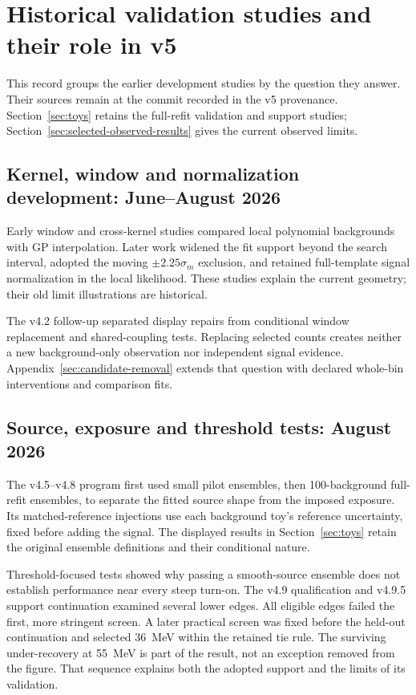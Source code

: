 \section{Historical validation studies and their role in v5}
\label{sec:v5-historical-validation}

This record groups the earlier development studies by the question they answer.
Their sources remain at the commit recorded in the v5 provenance.
Section~\ref{sec:toys} retains the full-refit validation and support studies;
Section~\ref{sec:selected-observed-results} gives the current observed limits.

\subsection{Kernel, window and normalization development: June--August 2026}
Early window and cross-kernel studies compared local polynomial backgrounds
with GP interpolation. Later work widened the fit support beyond the search
interval, adopted the moving $\pm2.25\sigma_m$ exclusion, and retained
full-template signal normalization in the local likelihood. These studies
explain the current geometry; their old limit illustrations are historical.

The v4.2 follow-up separated display repairs from conditional window
replacement and shared-coupling tests. Replacing selected counts creates
neither a new background-only observation nor independent signal evidence.
Appendix~\ref{sec:candidate-removal} extends that question with declared
whole-bin interventions and comparison fits.

\subsection{Source, exposure and threshold tests: August 2026}
The v4.5--v4.8 program first used small pilot ensembles, then 100-background
full-refit ensembles, to separate the fitted source shape from the imposed
exposure. Its matched-reference injections use each background toy's reference
uncertainty, fixed before adding the signal. The displayed results in Section~\ref{sec:toys}
retain the original ensemble definitions and their conditional nature.

Threshold-focused tests showed why passing a smooth-source ensemble does not
establish performance near every steep turn-on. The v4.9 qualification and
v4.9.5 support continuation examined several lower edges. All eligible edges
failed the first, more stringent screen. A later practical screen was fixed
before the held-out continuation and selected 36~MeV within the retained tie
rule. The surviving under-recovery at 55~MeV is part of the result, not an
exception removed from the figure. That sequence explains both the adopted
support and the limits of its validation.

